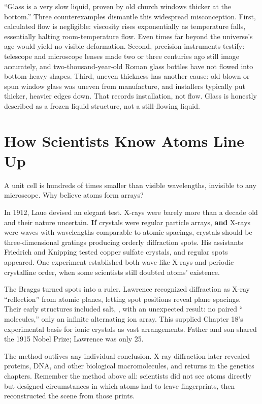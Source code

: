 \begin{wuqu}
``Glass is a very slow liquid, proven by old church windows thicker at the bottom.'' Three counterexamples dismantle this widespread misconception. First, calculated flow is negligible: viscosity rises exponentially as temperature falls, essentially halting room-temperature flow. Even times far beyond the universe's age would yield no visible deformation. Second, precision instruments testify: telescope and microscope lenses made two or three centuries ago still image accurately, and two-thousand-year-old Roman glass bottles have not flowed into bottom-heavy shapes. Third, uneven thickness has another cause: old blown or spun window glass was uneven from manufacture, and installers typically put thicker, heavier edges down. That records installation, not flow. Glass is honestly described as a frozen liquid structure, not a still-flowing liquid.
\end{wuqu}

\section{How Scientists Know Atoms Line Up}

A  unit cell is hundreds of times smaller than visible wavelengths, invisible to any microscope. Why believe atoms form arrays?

\begin{zhengju}
In 1912, Laue devised an elegant test. X-rays were barely more than a decade old and their nature uncertain. \textbf{If} crystals were regular particle arrays, \textbf{and} X-rays were waves with wavelengths comparable to atomic spacings, crystals should be three-dimensional gratings producing orderly diffraction spots. His assistants Friedrich and Knipping tested copper sulfate crystals, and regular spots appeared. One experiment established both wave-like X-rays and periodic crystalline order, when some scientists still doubted atoms' existence.

The Braggs turned spots into a ruler. Lawrence recognized diffraction as X-ray ``reflection'' from atomic planes, letting spot positions reveal plane spacings. Their early structures included salt, , with an unexpected result: no paired `` molecules,'' only an infinite alternating ion array. This supplied Chapter 18's experimental basis for ionic crystals as vast arrangements. Father and son shared the 1915 Nobel Prize; Lawrence was only 25.

The method outlives any individual conclusion. X-ray diffraction later revealed proteins, DNA, and other biological macromolecules, and returns in the genetics chapters. Remember the method above all: scientists did not see atoms directly but designed circumstances in which atoms had to leave fingerprints, then reconstructed the scene from those prints.
\end{zhengju}

